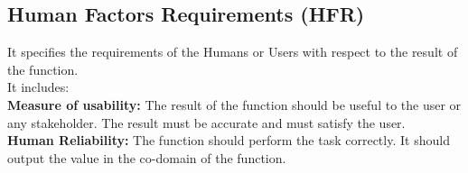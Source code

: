 \documentclass[12pt]{report}
\begin{document}
\subsection*{Human Factors Requirements (HFR)}It specifies the requirements of the Humans or Users with respect to the result of the function.\\ It includes:\\
\textbf{Measure of usability: }The result of the function should be useful to the user or any stakeholder. The result must be accurate and must satisfy the user.\\
\textbf{Human Reliability: }The function should perform the task correctly. It should output the value in the co-domain of the function.
\end{document}

